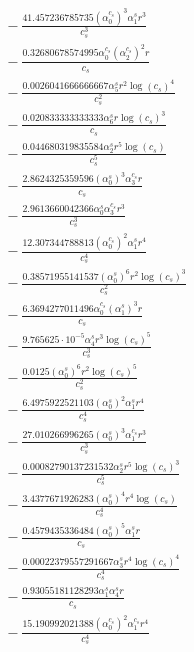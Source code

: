 \documentclass[10pt]{article}
\begin{document}
\begin{align*}
&{}  - \frac{41.457236785735 \left(\alpha_{0}^{c_s}\right)^{3} \alpha_{1}^s r^{3}}{c_{s}^{3}} \\
&{}  - \frac{0.32680678574995 \alpha_{0}^{c_s} \left(\alpha_{2}^{c_s}\right)^{2} r}{c_{s}} \\
&{}  - \frac{0.0026041666666667 \alpha_{5}^s r^{2} \log{\left(c_{s} \right)}^{4}}{c_{s}^{2}} \\
&{}  - \frac{0.020833333333333 \alpha_{6}^s r \log{\left(c_{s} \right)}^{3}}{c_{s}} \\
&{}  - \frac{0.044680319835584 \alpha_{2}^s r^{5} \log{\left(c_{s} \right)}}{c_{s}^{5}} \\
&{}  - \frac{2.8624325359596 \left(\alpha_{0}^s\right)^{3} \alpha_{3}^{c_s} r}{c_{s}} \\
&{}  - \frac{2.9613660042366 \alpha_{0}^s \alpha_{3}^{c_s} r^{3}}{c_{s}^{3}} \\
&{}  - \frac{12.307344788813 \left(\alpha_{0}^{c_s}\right)^{2} \alpha_{1}^s r^{4}}{c_{s}^{4}} \\
&{}  - \frac{0.38571955141537 \left(\alpha_{0}^s\right)^{6} r^{2} \log{\left(c_{s} \right)}^{3}}{c_{s}^{2}} \\
&{}  - \frac{6.3694277011496 \alpha_{0}^{c_s} \left(\alpha_{1}^s\right)^{3} r}{c_{s}} \\
&{}  - \frac{9.765625 \cdot 10^{-5} \alpha_{4}^s r^{3} \log{\left(c_{s} \right)}^{5}}{c_{s}^{3}} \\
&{}  - \frac{0.0125 \left(\alpha_{0}^s\right)^{6} r^{2} \log{\left(c_{s} \right)}^{5}}{c_{s}^{2}} \\
&{}  - \frac{6.4975922521103 \left(\alpha_{0}^s\right)^{2} \alpha_{1}^s r^{4}}{c_{s}^{4}} \\
&{}  - \frac{27.010266996265 \left(\alpha_{0}^s\right)^{3} \alpha_{1}^{c_s} r^{3}}{c_{s}^{3}} \\
&{}  - \frac{0.00082790137231532 \alpha_{2}^s r^{5} \log{\left(c_{s} \right)}^{3}}{c_{s}^{5}} \\
&{}  - \frac{3.4377671926283 \left(\alpha_{0}^s\right)^{4} r^{4} \log{\left(c_{s} \right)}}{c_{s}^{4}} \\
&{}  - \frac{0.4579435336484 \left(\alpha_{0}^s\right)^{5} \alpha_{1}^s r}{c_{s}} \\
&{}  - \frac{0.00022379557291667 \alpha_{3}^s r^{4} \log{\left(c_{s} \right)}^{4}}{c_{s}^{4}} \\
&{}  - \frac{0.93055181128293 \alpha_{1}^s \alpha_{4}^s r}{c_{s}} \\
&{}  - \frac{15.190992021388 \left(\alpha_{0}^{c_s}\right)^{2} \alpha_{1}^{c_s} r^{4}}{c_{s}^{4}} \\

\end{align*}
\end{document}
